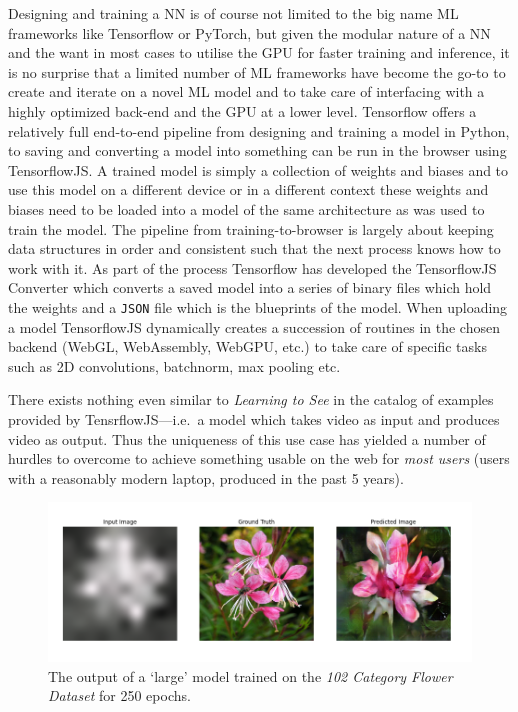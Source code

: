 \documentclass{article}
\begin{document}
Designing and training a NN is of course not limited to the big name ML frameworks like Tensorflow\cite{tf} or PyTorch\cite{pytorch}, but given the modular nature of a NN and the want in most cases to utilise the GPU for faster training and inference, it is no surprise that a limited number of ML frameworks have become the go-to to create and iterate on a novel ML model and to take care of interfacing with a highly optimized back-end and the GPU at a lower level. Tensorflow offers a relatively full end-to-end pipeline from designing and training a model in Python, to saving and converting a model into something can be run in the browser using TensorflowJS\cite{tfjs}. A trained model is simply a collection of weights and biases and to use this model on a different device or in a different context these weights and biases need to be loaded into a model of the same architecture as was used to train the model. The pipeline from training-to-browser is largely about keeping data structures in order and consistent such that the next process knows how to work with it. As part of the process Tensorflow has developed the TensorflowJS Converter\cite{tfjs_converter} which converts a saved model into a series of binary files which hold the weights and a \verb|JSON| file which is the blueprints of the model. When uploading a model TensorflowJS dynamically creates a succession of routines in the chosen backend (WebGL, WebAssembly, WebGPU, etc.) to take care of specific tasks such as 2D convolutions, batchnorm, max pooling etc.

There exists nothing even similar to \textit{Learning to See} in the catalog of examples provided by TensrflowJS---i.e.\ a model which takes video as input and produces video as output. Thus the uniqueness of this use case has yielded a number of hurdles to overcome to achieve something usable on the web for \textit{most users} (users with a reasonably modern laptop, produced in the past 5 years).

\begin{figure}[h!]
	\centering
	\includegraphics[width=\textwidth]{250_epochs}
	\caption{The output of a `large' model trained on the \textit{102 Category Flower Dataset}\cite{flowers_dataset} for 250 epochs.}
\end{figure}
\end{document}
